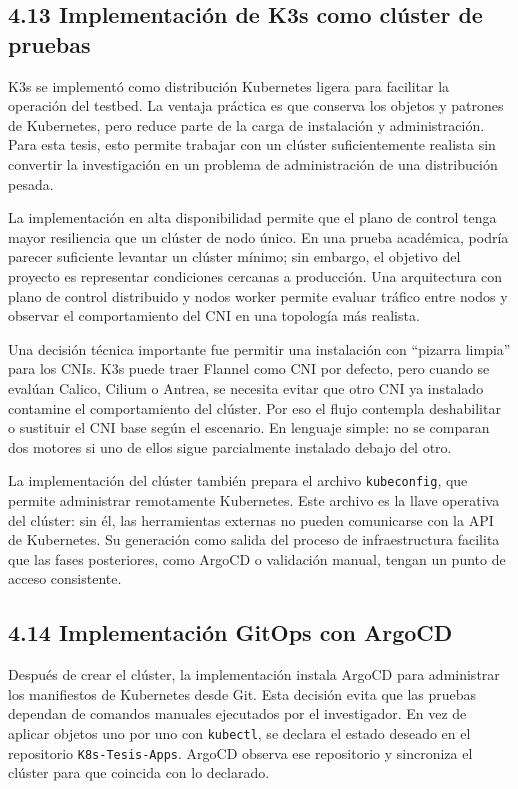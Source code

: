 \documentclass[journal]{IEEEtran}
\begin{document}
\subsection{4.13 Implementación de K3s como clúster de pruebas}

K3s se implementó como distribución Kubernetes ligera para facilitar la operación del testbed. La ventaja práctica es que conserva los objetos y patrones de Kubernetes, pero reduce parte de la carga de instalación y administración. Para esta tesis, esto permite trabajar con un clúster suficientemente realista sin convertir la investigación en un problema de administración de una distribución pesada.

La implementación en alta disponibilidad permite que el plano de control tenga mayor resiliencia que un clúster de nodo único. En una prueba académica, podría parecer suficiente levantar un clúster mínimo; sin embargo, el objetivo del proyecto es representar condiciones cercanas a producción. Una arquitectura con plano de control distribuido y nodos worker permite evaluar tráfico entre nodos y observar el comportamiento del CNI en una topología más realista.

Una decisión técnica importante fue permitir una instalación con ``pizarra limpia'' para los CNIs. K3s puede traer Flannel como CNI por defecto, pero cuando se evalúan Calico, Cilium o Antrea, se necesita evitar que otro CNI ya instalado contamine el comportamiento del clúster. Por eso el flujo contempla deshabilitar o sustituir el CNI base según el escenario. En lenguaje simple: no se comparan dos motores si uno de ellos sigue parcialmente instalado debajo del otro.

La implementación del clúster también prepara el archivo \texttt{kubeconfig}, que permite administrar remotamente Kubernetes. Este archivo es la llave operativa del clúster: sin él, las herramientas externas no pueden comunicarse con la API de Kubernetes. Su generación como salida del proceso de infraestructura facilita que las fases posteriores, como ArgoCD o validación manual, tengan un punto de acceso consistente.

\subsection{4.14 Implementación GitOps con ArgoCD}

Después de crear el clúster, la implementación instala ArgoCD para administrar los manifiestos de Kubernetes desde Git. Esta decisión evita que las pruebas dependan de comandos manuales ejecutados por el investigador. En vez de aplicar objetos uno por uno con \texttt{kubectl}, se declara el estado deseado en el repositorio \texttt{K8s-Tesis-Apps}. ArgoCD observa ese repositorio y sincroniza el clúster para que coincida con lo declarado.
\end{document}
